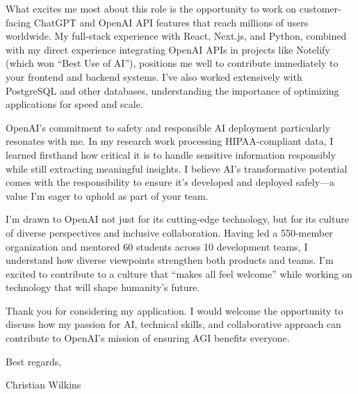 \documentclass[letterpaper,11pt]{article}
\begin{document}
\vspace{0.2in}

What excites me most about this role is the opportunity to work on customer-facing ChatGPT and OpenAI API features that reach millions of users worldwide. My full-stack experience with React, Next.js, and Python, combined with my direct experience integrating OpenAI APIs in projects like Notelify (which won ``Best Use of AI''), positions me well to contribute immediately to your frontend and backend systems. I've also worked extensively with PostgreSQL and other databases, understanding the importance of optimizing applications for speed and scale.

\vspace{0.2in}

OpenAI's commitment to safety and responsible AI deployment particularly resonates with me. In my research work processing HIPAA-compliant data, I learned firsthand how critical it is to handle sensitive information responsibly while still extracting meaningful insights. I believe AI's transformative potential comes with the responsibility to ensure it's developed and deployed safely—a value I'm eager to uphold as part of your team.

\vspace{0.2in}

I'm drawn to OpenAI not just for its cutting-edge technology, but for its culture of diverse perspectives and inclusive collaboration. Having led a 550-member organization and mentored 60 students across 10 development teams, I understand how diverse viewpoints strengthen both products and teams. I'm excited to contribute to a culture that ``makes all feel welcome'' while working on technology that will shape humanity's future.

\vspace{0.2in}

Thank you for considering my application. I would welcome the opportunity to discuss how my passion for AI, technical skills, and collaborative approach can contribute to OpenAI's mission of ensuring AGI benefits everyone.

\vspace{0.5in}

\noindent
Best regards, \\

\vspace{0.3in}

\noindent
Christian Wilkins
\end{document}
